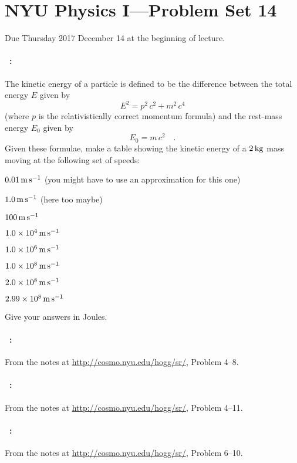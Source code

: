 \documentclass[12pt]{article}
\begin{document}
\section*{NYU Physics I---Problem Set 14}

Due Thursday 2017 December 14 at the beginning of lecture.

\paragraph{\problemname~\theproblem:}%
The kinetic energy of a particle is defined to be the difference between the
total energy $E$ given by
\begin{equation}
E^2 = p^2\,c^2 + m^2\,c^4
\end{equation}
(where $p$ is the relativistically correct momentum formula) and the
rest-mass energy $E_0$ given by
\begin{equation}
E_0 = m\,c^2 \quad.
\end{equation}
Given these formulae, make a table showing the kinetic energy of a $2\,\mathrm{kg}$ mass
moving at the following set of speeds:
\begin{trivlist}
\item $0.01\,\mathrm{m}\,\mathrm{s}^{-1}$ (you might have to use an approximation for this one)
\item $1.0\,\mathrm{m}\,\mathrm{s}^{-1}$ (here too maybe)
\item $100\,\mathrm{m}\,\mathrm{s}^{-1}$
\item $1.0\times10^4\,\mathrm{m}\,\mathrm{s}^{-1}$
\item $1.0\times10^6\,\mathrm{m}\,\mathrm{s}^{-1}$
\item $1.0\times10^8\,\mathrm{m}\,\mathrm{s}^{-1}$
\item $2.0\times10^8\,\mathrm{m}\,\mathrm{s}^{-1}$
\item $2.99\times10^8\,\mathrm{m}\,\mathrm{s}^{-1}$
\end{trivlist}
Give your answers in Joules.

\paragraph{\problemname~\theproblem:}%
From the notes at \url{http://cosmo.nyu.edu/hogg/sr/},
Problem 4--8.

\paragraph{\problemname~\theproblem:}%
From the notes at \url{http://cosmo.nyu.edu/hogg/sr/},
Problem 4--11.

\paragraph{\problemname~\theproblem:}%
From the notes at \url{http://cosmo.nyu.edu/hogg/sr/},
Problem 6--10.
\end{document}

